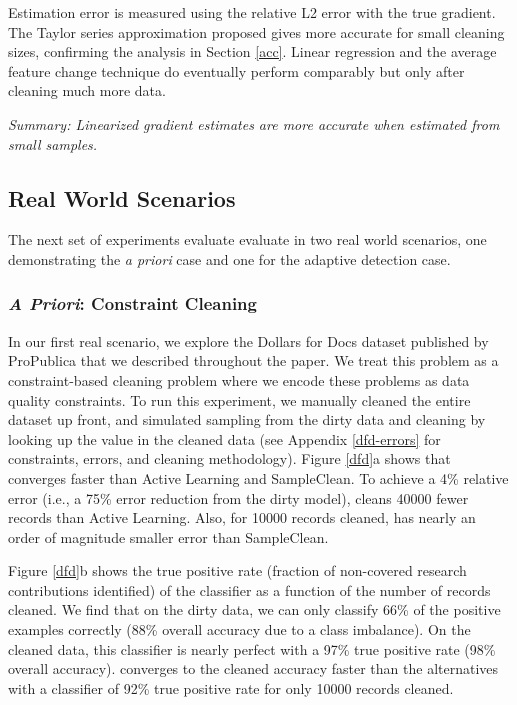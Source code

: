 Estimation error is measured using the relative L2 error with the true gradient.
The Taylor series approximation proposed gives more accurate for small cleaning sizes, confirming the analysis in Section \ref{acc}.
Linear regression and the average feature change technique do eventually perform comparably but only after cleaning much more data.

\vspace{0.25em}

\noindent \emph{Summary: Linearized gradient estimates are more accurate when estimated from small samples. }

\subsection{Real World Scenarios}
The next set of experiments evaluate evaluate \sys in two real world scenarios, one demonstrating the \emph{a priori} case and one for the adaptive detection case.

\subsubsection{\emph{A Priori}: Constraint Cleaning}\label{dfd-exp}
In our first real scenario, we explore the Dollars for Docs dataset published by ProPublica that we described throughout the paper.
We treat this problem as a constraint-based cleaning problem where we encode these problems as data quality constraints. 
To run this experiment, we manually cleaned the entire dataset up front, and simulated sampling from the dirty data and cleaning by looking up the value in the cleaned data (see Appendix \ref{dfd-errors} for constraints, errors, and cleaning methodology).
Figure \ref{dfd}a shows that \sys converges faster than Active Learning and SampleClean.
To achieve a 4\% relative error (i.e., a 75\% error reduction from the dirty model), \sys cleans 40000 fewer records than Active Learning.
Also, for 10000 records cleaned, \sys has nearly an order of magnitude smaller error than SampleClean.

Figure \ref{dfd}b shows the true positive rate (fraction of non-covered research contributions identified) of the classifier as a function of the number of records cleaned. 
We find that on the dirty data, we can only classify 66\% of the positive examples correctly (88\% overall accuracy due to a class imbalance).
On the cleaned data, this classifier is nearly perfect with a 97\% true positive rate (98\% overall accuracy).
\sys converges to the cleaned accuracy faster than the alternatives with a classifier of 92\% true positive rate for only 10000 records cleaned.


